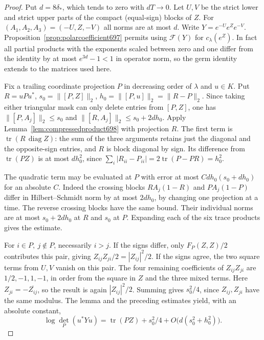 \documentclass[a4paper,11pt]{article}
\theoremstyle{definition}
\theoremstyle{remark}
\numberwithin{equation}{section}
\begin{document}
\begin{proof}
Put \(d=8\delta_*\), which tends to zero with \(dT\to0\).
Let \(U,V\) be the strict lower and strict upper parts of
the compact (equal-sign) blocks of \(Z\). For
\((A_1,A_2,A_3)=(-U,Z,-V)\) all norms are at most \(d\).
Write \(Y=e^{-U}e^Ze^{-V}\). Proposition~\ref{prop:polarcoefficient697}
permits using \(\mathcal F(Y)\) for \(c_\lambda(e^Z)\).
In fact all partial products with the exponents scaled
between zero and one differ from the identity by at most
\(e^{3d}-1<1\) in operator norm, so the germ identity extends
to the matrices used here.

Fix a trailing coordinate projection \(P\) in decreasing
order of \(\lambda\) and \(u\in K\). Put \(R=uPu^*\),
\(s_0=\|[P,Z]\|_2\), \(h_0=\|[P,u]\|_2=\|R-P\|_2\).
Since taking either triangular mask can only delete entries
from \([P,Z]\), one has \(\|[P,A_j]\|_2\le s_0\) and
\(\|[R,A_j]\|_2\le s_0+2dh_0\). Apply
Lemma~\ref{lem:compressedproduct698} with projection \(R\).
The first term is \(\operatorname{tr}(R\,\operatorname{diag} Z)\):
the sum of the three arguments retains just the diagonal and
the opposite-sign entries, and \(R\) is block diagonal by
sign. Its difference from \(\operatorname{tr}(PZ)\) is at most
\(dh_0^2\), since
\(\sum_i|R_{ii}-P_{ii}|=2\operatorname{tr}(P-PR)=h_0^2\).

The quadratic term may be evaluated at \(P\) with error
at most \(C d h_0(s_0+d h_0)\) for an absolute \(C\).
Indeed the crossing blocks \(RA_j(1-R)\) and
\(PA_j(1-P)\) differ in Hilbert--Schmidt norm by at most
\(2dh_0\), by changing one projection at a time. The
reverse crossing blocks have the same bound. Their
individual norms are at most \(s_0+2dh_0\) at \(R\)
and \(s_0\) at \(P\). Expanding each of the six trace
products gives the estimate.

For \(i\in P,\ j\notin P\), necessarily \(i>j\). If the
signs differ, only \(F_P(Z,Z)/2\) contributes this pair,
giving \(Z_{ij}Z_{ji}/2=|Z_{ij}|^2/2\). If the signs agree,
the two square terms from \(U,V\) vanish on this pair.
The four remaining coefficients of \(Z_{ij}Z_{ji}\) are
\(1/2,-1,1,-1\), in order from the square in \(Z\) and the
three mixed terms. Here \(Z_{ji}=-\overline{Z_{ij}}\), so
the result is again \(|Z_{ij}|^2/2\). Summing gives
\(s_0^2/4\), since \(Z_{ij},Z_{ji}\) have the same modulus.
The lemma and the preceding estimates yield, with an
absolute constant,
\[
  \log\det_P(u^*Yu)=\operatorname{tr}(PZ)+s_0^2/4
                                   +O\bigl(d(s_0^2+h_0^2)\bigr).
\]


\end{proof}
\end{document}
